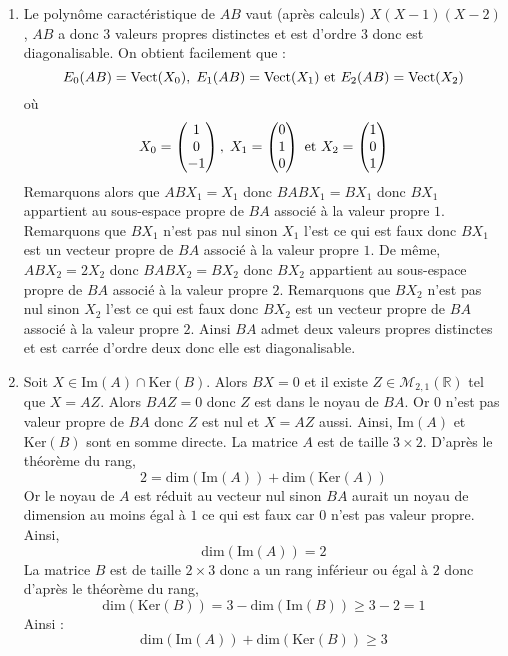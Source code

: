 \documentclass[a4paper,10pt]{report}
\begin{document}
\begin{enumerate}
\item Le polynôme caractéristique de $AB$ vaut (après calculs) $X(X-1)(X-2)$, $AB$ a donc $3$ valeurs propres distinctes et est d'ordre $3$ donc est diagonalisable. On obtient facilement que :
$$ E_{0}(AB) = \textrm{Vect}(X_0), \; E_{1}(AB) = \textrm{Vect}(X_1) \hbox{ et } E_{2}(AB) = \textrm{Vect}(X_2)$$
où 
$$ X_0 = \begin{pmatrix}
1 \\
0 \\
-1
\end{pmatrix},  \; X_1 = \begin{pmatrix}
0 \\
1 \\
0
\end{pmatrix} \hbox{ et } X_2 = \begin{pmatrix}
1 \\
0 \\
1
\end{pmatrix}$$
Remarquons alors que $ABX_1=X_1$ donc $BABX_1=BX_1$ donc $BX_1$ appartient au sous-espace propre de $BA$ associé à la valeur propre $1$. Remarquons que $BX_1$ n'est pas nul sinon $X_1$ l'est ce qui est faux donc $BX_1$ est un vecteur propre de $BA$ associé à la valeur propre $1$. De même, $ABX_2=2X_2$ donc $BABX_2=BX_2$ donc $BX_2$ appartient au sous-espace propre de $BA$ associé à la valeur propre $2$. Remarquons que $BX_2$ n'est pas nul sinon $X_2$ l'est ce qui est faux donc $BX_2$ est un vecteur propre de $BA$ associé à la valeur propre $2$.  Ainsi $BA$ admet deux valeurs propres distinctes et est carrée d'ordre deux donc elle est diagonalisable.
\item Soit $X \in \textrm{Im}(A) \cap \textrm{Ker}(B)$. Alors $BX=0$ et il existe $Z \in \mathcal{M}_{2,1}(\mathbb{R})$ tel que $X=AZ$. Alors $BAZ=0$ donc $Z$ est dans le noyau de $BA$. Or $0$ n'est pas valeur propre de $BA$ donc $Z$ est nul et $X=AZ$ aussi. Ainsi, $\textrm{Im}(A)$ et $\textrm{Ker}(B)$ sont en somme directe. La matrice $A$ est de taille $3 \times 2$. D'après le théorème du rang,
$$ 2 = \textrm{dim}(\textrm{Im}(A)) + \textrm{dim}(\textrm{Ker}(A))$$
Or le noyau de $A$ est réduit au vecteur nul sinon $BA$ aurait un noyau de dimension au moins égal à $1$ ce qui est faux car $0$ n'est pas valeur propre. Ainsi,
$$\textrm{dim}(\textrm{Im}(A))  = 2$$
La matrice $B$ est de taille $2 \times 3$ donc a un rang inférieur ou égal à $2$ donc d'après le théorème du rang,
$$ \textrm{dim}(\textrm{Ker}(B)) = 3- \textrm{dim}(\textrm{Im}(B)) \geq 3-2 = 1$$
Ainsi :
$$ \textrm{dim}(\textrm{Im}(A)) + \textrm{dim}(\textrm{Ker}(B)) \geq 3$$

\end{enumerate}
\end{document}
